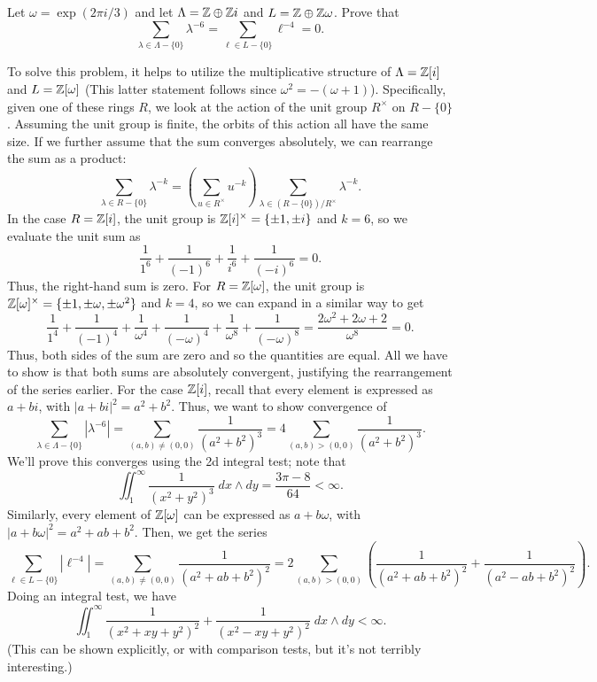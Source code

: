 \documentclass{pset}
\begin{document}
\begin{problem}{5.5}
  Let $\omega=\exp(2\pi i/3)$ and let $\Lambda = \mathbb{Z}\oplus \mathbb{Z} i$ and $L = \mathbb{Z} \oplus \mathbb{Z}\omega$. Prove that
  \[
    \sum_{\lambda \in \Lambda-\{0\}} \lambda^{-6} = \sum_{\ell\in L-\{0\}} \ell^{-4}=0.
  \]
\end{problem}

\begin{solution}
  To solve this problem, it helps to utilize the multiplicative structure of $\Lambda = \mathbb{Z}[i]$ and $L=\mathbb{Z}[\omega]$ (This latter statement follows since $\omega^2=-(\omega+1)$). Specifically, given one of these rings $R$, we look at the action of the unit group $R^\times$ on $R-\{0\}$. Assuming the unit group is finite, the orbits of this action all have the same size. If we further assume that the sum converges absolutely, we can rearrange the sum as a product:
  \[
    \sum_{\lambda \in R-\{0\}} \lambda^{-k} = \left(\sum_{u\in R^\times}u^{-k}\right)\sum_{\lambda\in (R-\{0\})/R^\times}\lambda^{-k}.
  \]
  In the case $R=\mathbb{Z}[i]$, the unit group is $\mathbb{Z}[i]^\times = \{\pm 1, \pm i\}$ and $k=6$, so we evaluate the unit sum as
  \[
    \frac{1}{1^6} + \frac{1}{(-1)^6} + \frac{1}{i^6} + \frac{1}{(-i)^6} = 0.
  \]
  Thus, the right-hand sum is zero. For $R=\mathbb{Z}[\omega]$, the unit group is $\mathbb{Z}[\omega]^\times = \{\pm 1, \pm \omega, \pm \omega^2\}$ and $k=4$, so we can expand in a similar way to get 
  \[
    \frac{1}{1^4}+\frac{1}{(-1)^4} + \frac{1}{\omega^4}+\frac{1}{(-\omega)^4}+\frac{1}{\omega^8} + \frac{1}{(-\omega)^8}=\frac{2\omega^2+2\omega+2}{\omega^8} = 0.
  \]
  Thus, both sides of the sum are zero and so the quantities are equal. All we have to show is that both sums are absolutely convergent, justifying the rearrangement of the series earlier. For the case $\mathbb{Z}[i]$, recall that every element is expressed as $a+bi$, with $|a+bi|^2=a^2+b^2$. Thus, we want to show convergence of  
  \[
    \sum_{\lambda\in \Lambda-\{0\}} \left|\lambda^{-6}\right| = \sum_{(a,b)\neq (0,0)}\frac{1}{(a^2+b^2)^3} = 4\sum_{(a,b)>(0,0)} \frac{1}{(a^2+b^2)^3}.
  \]
  We'll prove this converges using the 2d integral test; note that
  \[
    \iint_1^\infty \frac{1}{(x^2+y^2)^3} \;dx\wedge dy =\frac{3\pi - 8}{64} < \infty.
  \]
  Similarly, every element of $\mathbb{Z}[\omega]$ can be expressed as $a+b\omega$, with $|a+b\omega|^2 = a^2+ab+b^2$. Then, we get the series
  \[
    \sum_{\ell\in L-\{0\}} \left|\ell^{-4}\right| = \sum_{(a,b)\neq (0,0)}\frac{1}{(a^2+ab+b^2)^2} = 2\sum_{(a,b)>(0,0)} \left(\frac{1}{(a^2+ab+b^2)^2} +\frac{1}{(a^2-ab+b^2)^2}\right).
  \]
  Doing an integral test, we have
  \[
    \iint_1^\infty \frac{1}{(x^2+xy+y^2)^2}+\frac{1}{(x^2-xy+y^2)^2}\; dx\wedge dy < \infty.
  \]
  (This can be shown explicitly, or with comparison tests, but it's not terribly interesting.)
\end{solution}
\end{document}
